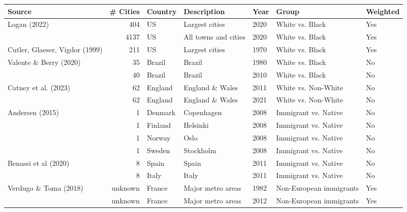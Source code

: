 \begin{tabular}{lrlllll}
\hline
Source                         & \# Cities & Country & Description          & Year & Group                & Weighted \\
\hline
Logan (2022)                   & 404       & US      & Largest cities       & 2020 & White vs. Black      & Yes      \\
                               & 4137     & US      & All towns and cities & 2020 & White vs. Black      & Yes      \\
Cutler, Glaeser, Vigdor (1999) & 211       & US      & Largest cities       & 1970 & White vs. Black      & Yes      \\
Valente \& Berry  (2020)       & 35        & Brazil  & Brazil               & 1980 & White vs. Black      & No       \\
                               & 40        & Brazil  & Brazil               & 2010 & White vs. Black      & No       \\
Catney et al. (2023)           & 62        & England & England \& Wales     & 2011 & White vs. Non-White  & No       \\
                               & 62        & England & England \& Wales     & 2021 & White vs. Non-White  & No       \\
Andersen (2015)                & 1         & Denmark & Copenhagen           & 2008 & Immigrant vs. Native & No       \\
                               & 1         & Finland & Helsinki             & 2008 & Immigrant vs. Native & No       \\
                               & 1         & Norway  & Oslo                 & 2008 & Immigrant vs. Native & No       \\
                               & 1         & Sweden  & Stockholm            & 2008 & Immigrant vs. Native & No       \\
Benassi et al (2020)           & 8         & Spain   & Spain                & 2011 & Immigrant vs. Native & No       \\
                               & 8         & Italy   & Italy                & 2011 & Immigrant vs. Native & No       \\
Verdugo \& Toma (2018)         & unknown   & France  & Major metro areas    & 1982 & Non-European immigrants & Yes       \\
                               & unknown   & France  & Major metro areas    & 2012 & Non-European immigrants & Yes       \\
\hline
\end{tabular}

